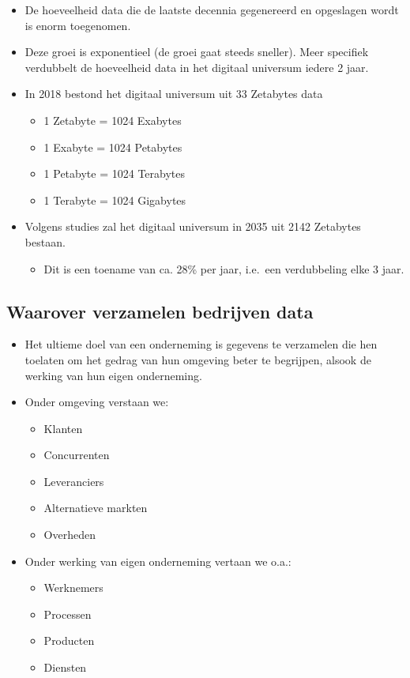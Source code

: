 \documentclass[]{tufte-book}
\providecommand{\tightlist}{%
  \setlength{\itemsep}{0pt}\setlength{\parskip}{0pt}}
\begin{document}
\begin{itemize}
\tightlist
\item
  De hoeveelheid data die de laatste decennia gegenereerd en opgeslagen wordt is enorm toegenomen.
\item
  Deze groei is exponentieel (de groei gaat steeds sneller). Meer specifiek verdubbelt de hoeveelheid data in het digitaal universum iedere 2 jaar.
\item
  In 2018 bestond het digitaal universum uit 33 Zetabytes data

  \begin{itemize}
  \tightlist
  \item
    1 Zetabyte = 1024 Exabytes
  \item
    1 Exabyte = 1024 Petabytes
  \item
    1 Petabyte = 1024 Terabytes
  \item
    1 Terabyte = 1024 Gigabytes
  \end{itemize}
\item
  Volgens studies zal het digitaal universum in 2035 uit 2142 Zetabytes bestaan.

  \begin{itemize}
  \tightlist
  \item
    Dit is een toename van ca. 28\% per jaar, i.e.~een verdubbeling elke 3 jaar.
  \end{itemize}
\end{itemize}

\hypertarget{waarover-verzamelen-bedrijven-data}{%
\subsection{Waarover verzamelen bedrijven data}\label{waarover-verzamelen-bedrijven-data}}

\begin{itemize}
\tightlist
\item
  Het ultieme doel van een onderneming is gegevens te verzamelen die hen toelaten om het gedrag van hun omgeving beter te begrijpen, alsook de werking van hun eigen onderneming.
\item
  Onder omgeving verstaan we:

  \begin{itemize}
  \tightlist
  \item
    Klanten
  \item
    Concurrenten
  \item
    Leveranciers
  \item
    Alternatieve markten
  \item
    Overheden
  \end{itemize}
\item
  Onder werking van eigen onderneming vertaan we o.a.:

  \begin{itemize}
  \tightlist
  \item
    Werknemers
  \item
    Processen
  \item
    Producten
  \item
    Diensten
  \end{itemize}
\end{itemize}
\end{document}
